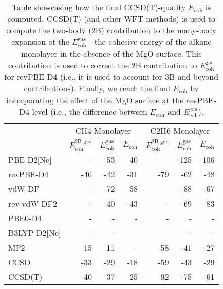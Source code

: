 \begin{table}
\caption{\label{tab:monolayer_ecoh}Table showcasing how the final CCSD(T)-quality $E_\textrm{coh}$ is computed. CCSD(T) (and other WFT methods) is used to compute the two-body (2B) contribution to the many-body expansion of the $E_\textrm{coh}^\textrm{gas}$ - the cohesive energy of the alkane monolayer in the absence of the MgO surface. This contribution is used to correct the 2B contribution to $E_\textrm{coh}^\textrm{gas}$ for revPBE-D4 (i.e., it is used to account for 3B and beyond contributions). Finally, we reach the final $E_\textrm{coh}$ by incorporating the effect of the MgO surface at the revPBE-D4 level (i.e., the difference between $E_\textrm{coh}$ and $E_\textrm{coh}^\textrm{gas}$).}
\begin{adjustbox}{center}
\begin{tabular}{lrrrrrr}
\toprule
 & \multicolumn{3}{c}{CH4 Monolayer} & \multicolumn{3}{c}{C2H6 Monolayer} \\ 
 & $E_\textrm{coh}^\textrm{2B gas}$ & $E_\textrm{coh}^\textrm{gas}$ & $E_\textrm{coh}$ & $E_\textrm{coh}^\textrm{2B gas}$ & $E_\textrm{coh}^\textrm{gas}$ & $E_\textrm{coh}$ \\
\midrule
PBE-D2[Ne] & - & -53 & -40 & - & -125 & -106 \\
revPBE-D4 & -46 & -42 & -31 & -79 & -62 & -48 \\
vdW-DF & - & -72 & -58 & - & -88 & -67 \\
rev-vdW-DF2 & - & -40 & -43 & - & -69 & -83 \\
PBE0-D4 & - & - & - & - & - & - \\
B3LYP-D2[Ne] & - & - & - & - & - & - \\
MP2 & -15 & -11 & - & -58 & -41 & -27 \\
CCSD & -33 & -29 & -18 & -59 & -43 & -29 \\
CCSD(T) & -40 & -37 & -25 & -92 & -75 & -61 \\
\bottomrule
\end{tabular}
\end{adjustbox}
\end{table}
